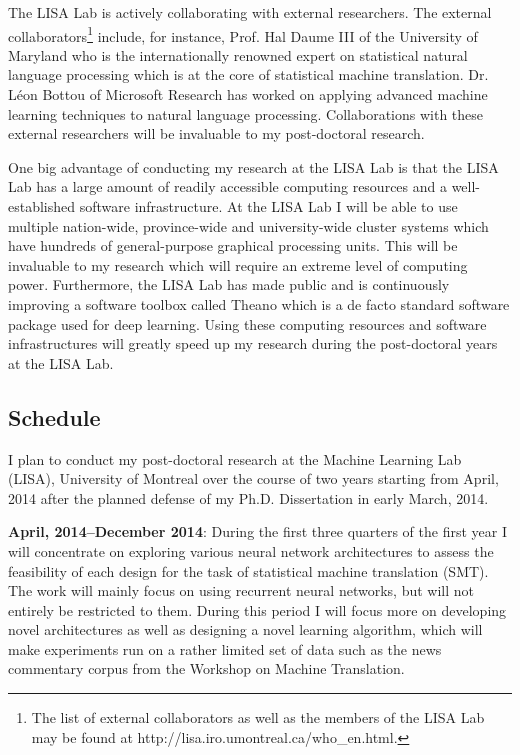 \documentclass[11pt, oneside]{essay}
\begin{document}
The LISA Lab is actively collaborating with external researchers.
The external collaborators\footnote{The list of external
collaborators as well as the members of the LISA Lab may be
found at http://lisa.iro.umontreal.ca/who\_en.html.}
include, for instance, Prof. Hal Daume III of the
University of Maryland who is the internationally
renowned expert on statistical natural language
processing which is at the core of statistical machine
translation. Dr. L\'eon Bottou of Microsoft Research has
worked on applying advanced machine learning techniques
to natural language processing.  Collaborations with
these external researchers will be invaluable to my
post-doctoral research.

One big advantage of conducting my research at the LISA Lab is
that the LISA Lab has a large amount of readily accessible
computing resources and a well-established software
infrastructure.  At the LISA Lab I will be able to use multiple
nation-wide, province-wide and university-wide cluster systems which
have hundreds of general-purpose graphical processing units.
This will be invaluable to my research which will require an extreme
level of computing power.  Furthermore, the LISA Lab has made
public and is continuously improving a software toolbox called
Theano \citep{Bergstra2010scipy} which is a de facto standard
software package used for deep learning. Using these computing
resources and software infrastructures will greatly speed up my
research during the post-doctoral years at the LISA Lab. 


\subsection{Schedule}

I plan to conduct my post-doctoral research at the Machine
Learning Lab (LISA), University of Montreal over the course of two years
starting from April, 2014 after the planned defense of my Ph.D.
Dissertation in early March, 2014. 

\textbf{April, 2014--December 2014}: During the first three quarters of the first
year I will concentrate on exploring various neural network
architectures to assess the feasibility of each design for the
task of statistical machine translation (SMT). The work will mainly
focus on using recurrent neural networks, but will not entirely
be restricted to them. During this period I will focus more on
developing novel architectures as well as designing a novel
learning algorithm, which will make experiments run on a rather
limited set of data such as the news commentary corpus from the
Workshop on Machine Translation.
\end{document}

